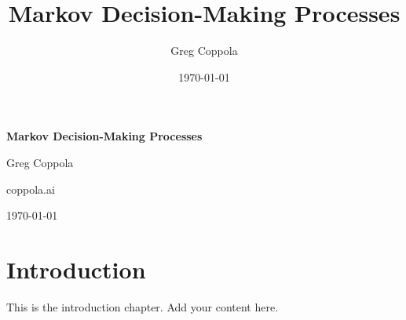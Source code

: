 \documentclass[12pt]{book}
\title{Markov Decision-Making Processes}
\author{Greg Coppola}
\date{\today}
\newcommand{\publisher}{coppola.ai}
\begin{document}
\begin{titlepage}
    \centering
    {\Huge \bfseries Markov Decision-Making Processes \par}
    \vspace{1.5cm}
    {\Large Greg Coppola \par}
    \vspace{2cm}
    {\large \publisher \par}
    \vfill
    {\large \today \par}
\end{titlepage}

\frontmatter
\tableofcontents

\mainmatter
\chapter{Introduction}
This is the introduction chapter. Add your content here.


\backmatter
\end{document}
